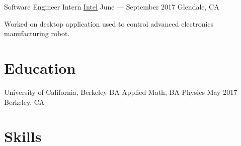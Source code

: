 \documentclass[letterpaper]{resume_config}
\begin{document}
\WorkExperience
    {Software Engineer Intern} %
    {\href{https://intel.com}{Intel}} %
    {June --- September 2017} %
    {Glendale, CA} %
    {
        \item Worked on desktop application used to control advanced electronics manufacturing robot.
    }
\vspace{-10pt}




\section{Education}

\EducationExperience
    {University of California, Berkeley} %
    {BA Applied Math, BA Physics} %
    {May 2017} %
    {Berkeley, CA} %

\vspace{-14pt}

\section{Skills}

\vspace{1pt}

\end{document}
